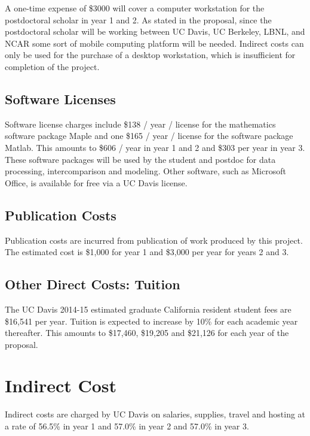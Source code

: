 \documentclass[11pt]{article}
\begin{document}
A one-time expense of \$3000 will cover a computer workstation for the postdoctoral scholar in year 1 and 2. As stated in the proposal, since the postdoctoral scholar will be working between UC Davis, UC Berkeley, LBNL, and NCAR some sort of mobile computing platform will be needed. Indirect costs can only be used for the purchase of a desktop workstation, which is insufficient for completion of the project. 

\subsection{Software Licenses}

Software license charges include \$138 / year / license for the mathematics software package Maple and one \$165 / year / license for the software package Matlab.  This amounts to \$606 / year in year 1 and 2 and \$303 per year in year 3.  These software packages will be used by the student and postdoc for data processing, intercomparison and modeling.  Other software, such as Microsoft Office, is available for free via a UC Davis license.

\subsection{Publication Costs}

Publication costs are incurred from publication of work produced by this project.  The estimated cost is \$1,000 for year 1 and \$3,000 per year for years 2 and 3.

\subsection{Other Direct Costs: Tuition}

The UC Davis 2014-15 estimated graduate California resident student fees are \$16,541 per year.  Tuition is expected to increase by 10\% for each academic year thereafter.  This amounts to \$17,460, \$19,205 and \$21,126 for each year of the proposal.

\section{Indirect Cost}
\vspace{-0.3cm}

Indirect costs are charged by UC Davis on salaries, supplies, travel and hosting at a rate of 56.5\% in year 1 and 57.0\% in year 2 and 57.0\% in year 3.
\end{document}
